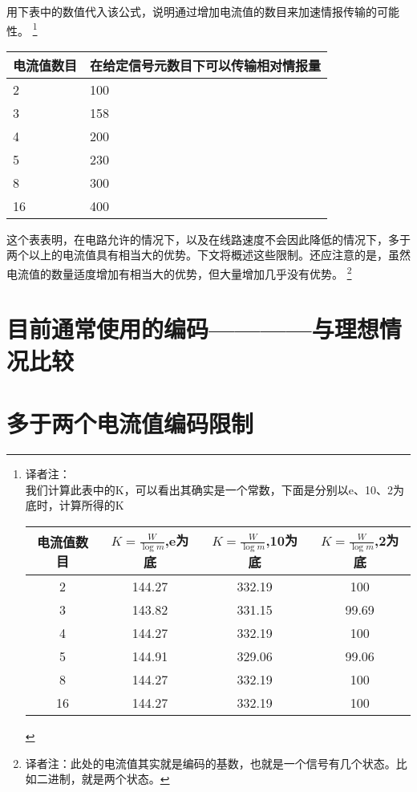 \documentclass{hfutpaper}
\begin{document}
用下表中的数值代入该公式，说明通过增加电流值的数目来加速情报传输的可能性。
\footnote{译者注：\\
	我们计算此表中的K，可以看出其确实是一个常数，下面是分别以e、10、2为底时，计算所得的K
	\\
	\begin{tabular}{|c|c|c|c|}
		\hline 
		电流值数目&$K=\frac{W}{\log{m}}$,e为底  & $K=\frac{W}{\log{m}}$,10为底 & $K=\frac{W}{\log{m}}$,2为底 \\ 
		\hline 
		2& 144.27 & 332.19 & 100 \\ 
		\hline 
		3& 143.82 & 331.15 & 99.69 \\ 
		\hline 
		4& 144.27 & 332.19 & 100 \\ 
		\hline 
		5& 144.91 & 329.06 & 99.06 \\ 
		\hline 
		8& 144.27 & 332.19 & 100 \\ 
		\hline 
		16   & 144.27 & 332.19 & 100 \\ 
		\hline 
	\end{tabular} 
}
\par
\begin{table}
	\centering
	\begin{tabular}{|p{3cm}<{\centering} | p{5cm}<{\centering} |}
		\hline 
		电流值数目&  在给定信号元数目下可以传输相对情报量\\ 
		\hline 
		2& 100 \\ 
		\hline 
		3& 158 \\ 
		\hline 
		4& 200 \\ 
		\hline 
		5& 230 \\ 
		\hline 
		8& 300 \\ 
		\hline 
		16& 400 \\ 
		\hline 
	\end{tabular} 
\end{table}
\par
这个表表明，在电路允许的情况下，以及在线路速度不会因此降低的情况下，多于两个以上的电流值具有相当大的优势。下文将概述这些限制。还应注意的是，虽然电流值的数量适度增加有相当大的优势，但大量增加几乎没有优势。
\footnote{译者注：此处的电流值其实就是编码的基数，也就是一个信号有几个状态。比如二进制，就是两个状态。}
\par


\section{目前通常使用的编码————与理想情况比较}

\section{多于两个电流值编码限制}
\end{document}
